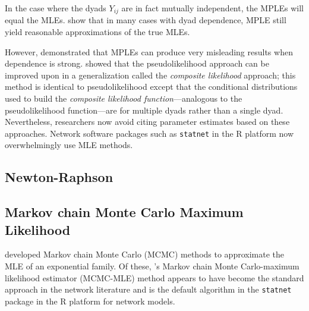 In the case where the dyads $Y_{ij}$ are in fact mutually independent, the MPLEs will equal the MLEs.  
\citet{Strauss:1990} show that in 
many cases with dyad dependence, MPLE still yield reasonable approximations of the 
true MLEs.  

However, \citet*{Geyer:1992, Snijders:2002, Duijn:2009} demonstrated that 
MPLEs can produce very misleading results when dependence is strong.  
\citet*{Composite} showed that the pseudolikelihood approach can be 
improved upon in a generalization 
called the \emph{composite likelihood} approach; this method is identical
to pseudolikelihood except that the conditional distributions used to build the \emph{composite likelihood function}---analogous to the pseudolikelihood function---are for multiple dyads rather than a single dyad.
Nevertheless, researchers now avoid citing parameter estimates based on these approaches.
Network software packages such as \texttt{statnet} \citep*{statnet:R} in the R 
platform now overwhelmingly use MLE methods.  


\subsection{Newton-Raphson}



\subsection{Markov chain Monte Carlo Maximum Likelihood} \label{S:MCMC-MLE}
\citet{Geyer:1992, Corander:1998, Snijders:2002} developed Markov chain Monte Carlo 
(MCMC) methods to approximate the MLE of an exponential family.  Of these, \citeauthor
{Geyer:1992}'s Markov chain Monte Carlo-maximum likelihood estimator (MCMC-MLE) method 
appears to have become the standard approach in the network literature 
\citep{Hunter:2006, Handcock:2006, GOF} and is the default algorithm in 
the \texttt{statnet} package \citep{statnet:R} in the R platform for network models.  

